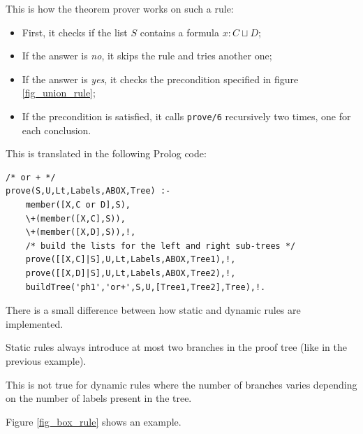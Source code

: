 \documentclass[a4paper, 11pt, oneside]{duthesis}
\begin{document}
This is how the theorem prover works on such a rule:

\begin{itemize}
\item First, it checks if the list $S$ contains a formula $x : C \sqcup D$;
\item If the answer is \emph{no}, it skips the rule and tries another one;
\item If the answer is \emph{yes}, it checks the precondition specified in figure \ref{fig_union_rule};
\item If the precondition is satisfied, it calls \texttt{prove/6} recursively two times, one for each conclusion.
\end{itemize}

\newpage


This is translated in the following Prolog code:

\begin{lstlisting}[caption={alct1.pl}, label={lst:zaino}, firstnumber=175]
/* or + */
prove(S,U,Lt,Labels,ABOX,Tree) :-
    member([X,C or D],S),
    \+(member([X,C],S)),
    \+(member([X,D],S)),!,
    /* build the lists for the left and right sub-trees */
    prove([[X,C]|S],U,Lt,Labels,ABOX,Tree1),!,
    prove([[X,D]|S],U,Lt,Labels,ABOX,Tree2),!,
    buildTree('ph1','or+',S,U,[Tree1,Tree2],Tree),!.
\end{lstlisting}\vspace{0.5cm}

There is a small difference between how static and dynamic rules are implemented.

Static rules always introduce at most two branches in the proof tree (like in the previous example).

This is not true for dynamic rules where the number of branches varies depending on the number of labels present in the tree.

Figure \ref{fig_box_rule} shows an example.
\end{document}
